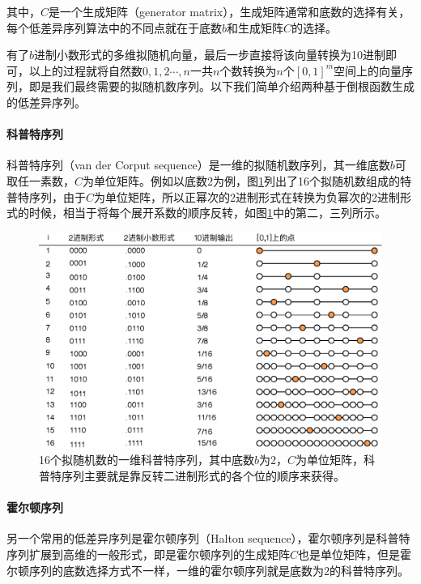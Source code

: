 \noindent 其中，$C$是一个生成矩阵（generator matrix），生成矩阵通常和底数的选择有关，每个低差异序列算法中的不同点就在于底数$b$和生成矩阵$C$的选择。

有了$b$进制小数形式的多维拟随机向量，最后一步直接将该向量转换为10进制即可，以上的过程就将自然数$0,1,2\cdots,n$一共$n$个数转换为$n$个$[0,1]^{m}$空间上的向量序列，即是我们最终需要的拟随机数序列。以下我们简单介绍两种基于倒根函数生成的低差异序列。




\paragraph{科普特序列}
科普特序列（van der Corput sequence）是一维的拟随机数序列，其一维底数$b$可取任一素数，$C$为单位矩阵。例如以底数2为例，图\ref{f:mc-corput}列出了16个拟随机数组成的特普特序列，由于$C$为单位矩阵，所以正幂次的2进制形式在转换为负幂次的2进制形式的时候，相当于将每个展开系数的顺序反转，如图\ref{f:mc-corput}中的第二，三列所示。

\begin{figure}
	\sidecaption
	\includegraphics[width=1.0\textwidth]{figures/mc/corput}
\caption{16个拟随机数的一维科普特序列，其中底数$b$为2，$C$为单位矩阵，科普特序列主要就是靠反转二进制形式的各个位的顺序来获得。}
\label{f:mc-corput}
\end{figure}




\paragraph{霍尔顿序列}
另一个常用的低差异序列是霍尔顿序列（Halton sequence），霍尔顿序列是科普特序列扩展到高维的一般形式，即是霍尔顿序列的生成矩阵$C$也是单位矩阵，但是霍尔顿序列的底数选择方式不一样，一维的霍尔顿序列就是底数为$2$的科普特序列。

